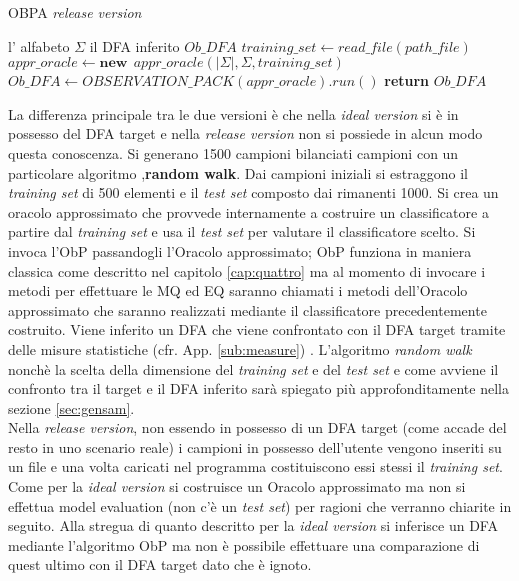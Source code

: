 \begin{algorithm}
\caption{OBPA \textit{release version}}\label{alg:obpar}
\begin{algorithmic}[1]
\Statex
\Input l' alfabeto $\Sigma$
\Output il \ac{DFA} inferito $Ob\_DFA$
\State $training\_set \gets read\_file(path\_file)$ 
\State $appr\_oracle \gets \textbf{new}\:\: appr\_oracle(|\Sigma|,\Sigma,training\_set)$
\State $Ob\_DFA \gets OBSERVATION\_PACK(appr\_oracle).run()$
 \State \textbf{return} $Ob\_DFA$
     
\end{algorithmic}
\end{algorithm}

La differenza principale tra le due versioni è che nella \textit{ideal version} si è in possesso del \ac{DFA} target e nella \textit{release version} non si possiede in alcun modo questa conoscenza.  Si generano 1500 campioni bilanciati campioni con un particolare algoritmo ,\textbf{random walk}.  Dai campioni iniziali si estraggono il \textit{training set} di 500 elementi e il \textit{test set} composto dai rimanenti 1000. Si crea un oracolo approssimato che provvede internamente a costruire un classificatore a partire dal \textit{training set} e usa il \textit{test set} per valutare il classificatore scelto. Si invoca l'\ac{ObP} passandogli l'Oracolo approssimato; \ac{ObP} funziona in maniera classica come descritto nel capitolo \ref{cap:quattro} ma al momento di invocare i metodi per effettuare le \ac{MQ} ed \ac{EQ} saranno chiamati i metodi dell'Oracolo approssimato  che saranno realizzati mediante il classificatore precedentemente costruito. Viene inferito un \ac{DFA} che viene confrontato con il \ac{DFA} target tramite delle misure statistiche (cfr. App. \ref{sub:measure}) .  L'algoritmo \textit{random walk} nonchè la scelta della dimensione del \textit{training set} e del \textit{test set}  e come avviene il confronto tra il target e il \ac{DFA} inferito sarà spiegato più approfonditamente nella sezione \ref{sec:gensam}.\\
Nella \textit{release version}, non essendo in possesso di un \ac{DFA} target (come accade del resto in uno scenario reale) i campioni in possesso dell'utente vengono inseriti su un file e una volta caricati nel programma costituiscono essi stessi il \textit{training set}. Come per la \textit{ideal version} si costruisce un Oracolo approssimato ma non si effettua model evaluation (non c'è un \textit{test set}) per ragioni che verranno chiarite in seguito. Alla stregua di quanto descritto per la \textit{ideal version} si inferisce un \ac{DFA} mediante l'algoritmo \ac{ObP} ma non è possibile effettuare una comparazione di quest ultimo con il \ac{DFA} target dato che è ignoto. \\

